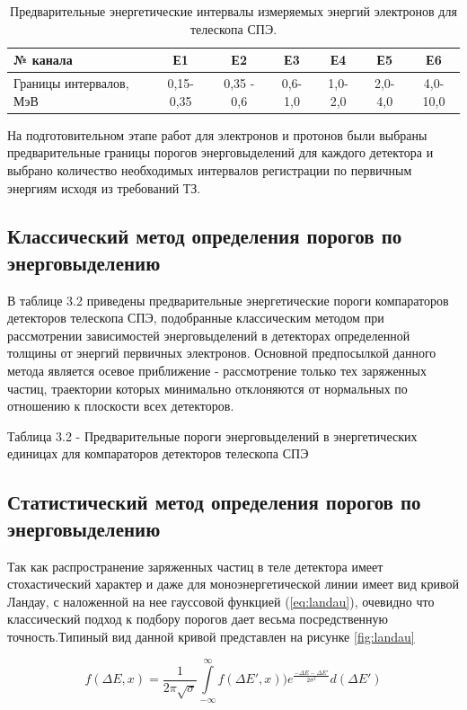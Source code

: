 \begin{table}
	\begin{tabular}{p{4.7cm}|cccccc}
№ канала&	Е1&	Е2&	Е3&	Е4&	Е5&	Е6\\ \hline
Границы интервалов, МэВ&	0,15-0,35&	0,35 - 0,6&	0,6-1,0&	1,0-2,0&	2,0-4,0&	4,0-10,0 
\end{tabular}
	\caption{Предварительные энергетические интервалы измеряемых энергий электронов для телескопа СПЭ.}
	\label{tab:elec_channel}
\end{table} 


На подготовительном этапе работ для электронов и протонов были выбраны предварительные границы порогов энерговыделений для каждого детектора и выбрано количество необходимых интервалов регистрации по первичным энергиям исходя из требований ТЗ. 
\subsection{Классический метод определения порогов по энерговыделению}
В таблице 3.2 приведены предварительные энергетические пороги компараторов детекторов телескопа СПЭ, подобранные классическим методом при рассмотрении зависимостей энерговыделений в детекторах определенной толщины от энергий первичных электронов. Основной предпосылкой данного метода является осевое приближение - рассмотрение только тех заряженных частиц, траектории которых минимально отклоняются от нормальных по отношению к плоскости всех детекторов. 

Таблица 3.2 - Предварительные пороги энерговыделений в энергетических единицах для компараторов детекторов телескопа СПЭ

\subsection{Статистический метод определения порогов по энерговыделению}
Так как распространение заряженных частиц в теле детектора имеет стохастический характер и даже для моноэнергетической линии имеет вид кривой Ландау, с наложенной на нее гауссовой функцией (\ref{eq:landau}), очевидно что классический подход к подбору порогов дает весьма посредственную точность.Типиный вид данной кривой представлен на рисунке \ref{fig:landau}

\begin{equation} \label{eq:landau}
f(\Delta E, x) = \frac{1}{2\pi\sqrt{\sigma}} \int\limits_{-\infty}^{\infty}{f(\Delta E', x))e^{\frac{-\Delta E - \Delta E'}{2\sigma^2}}d(\Delta E')}
\end{equation}

